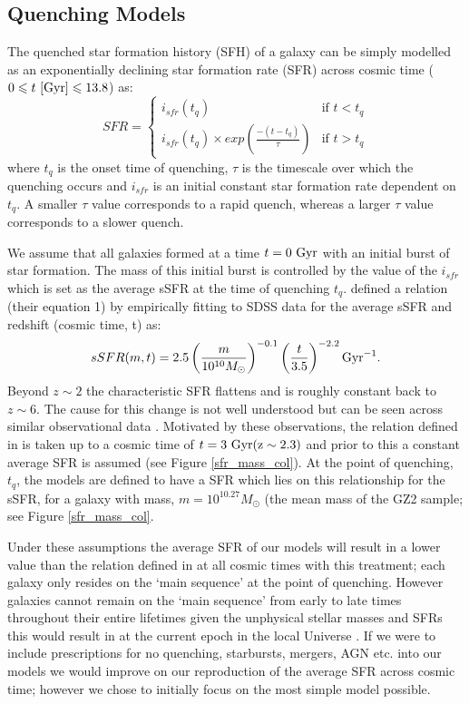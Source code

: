 \documentclass[useAMS,usenatbib]{mn2e}
\def\changed    {\color{titlecol} }
\begin{document}
\subsection{Quenching Models}\label{sfh}

The quenched star formation history (SFH) of a galaxy can be simply modelled as an exponentially declining star formation rate (SFR) across cosmic time ($0 \leq t ~\rm{[Gyr]} \leq 13.8$) as:
\begin{equation}\label{sfh}
SFR =
\begin{cases}
i_{sfr}(t_q) & \text{if } t < t_q \\
i_{sfr}(t_q) \times exp{\left( \frac{-(t-t_{q})}{\tau}\right)} & \text{if } t > t_q 
\end{cases}
\end{equation}
where $t_{q}$ is the onset time of quenching, $\tau$ is the timescale over which the quenching occurs and $i_{sfr}$ is an initial constant star formation rate dependent on $t_q$.  A smaller $\tau$ value corresponds to a rapid quench, whereas a larger $\tau$ value corresponds to a slower quench. 

We assume that all galaxies formed at a time $t=0~\rm{Gyr}$ with an initial burst of star formation. The mass of this initial burst is controlled by the value of the $i_{sfr}$ which is set as the average sSFR at the time of quenching $t_q$. \citet{Peng} defined a relation (their equation 1) by {\changed empirically fitting to SDSS data for the average sSFR and redshift (cosmic time, t)} as:
\begin{equation}
sSFR(m,t) = 2.5 \left( \frac{m}{10^{10} M_{\odot}} \right)^{-0.1} \left(\frac{t}{3.5}\right)^{-2.2} \rm{Gyr}^{-1}.
\end{equation}
Beyond $z \sim 2$ the characteristic SFR flattens and is roughly constant back to $z\sim6$. The cause for this change is not well understood but can be seen across similar observational data \citep{Peng, Gonzalez, Beth}. Motivated by these observations, the relation defined in \citet{Peng} is taken up to a cosmic time of $t=3~\rm{Gyr} (z \sim 2.3)$ and prior to this a constant average SFR is assumed (see Figure \ref{sfr_mass_col}). At the point of quenching, $t_{q}$, the models are defined to have a SFR which lies on this relationship for the sSFR, for a galaxy with mass, $m = 10^{10.27} M_{\odot}$ (the mean mass of the GZ2 sample; see Figure \ref{sfr_mass_col}.
 
Under these assumptions the average SFR of our models will result in a lower value than the relation defined in \citet{Peng} at all cosmic times with this treatment; each galaxy only resides on the `main sequence' at the point of quenching. However galaxies cannot remain on the `main sequence' from early to late times throughout their entire lifetimes given the unphysical stellar masses and SFRs this would result in at the current epoch in the local Universe \citep{Beth, Heinis14}. If we were to include prescriptions for no quenching, starbursts, mergers, AGN etc. into our models we would improve on our reproduction of the average SFR across cosmic time; however we chose to initially focus on the most simple model possible.
\end{document}
